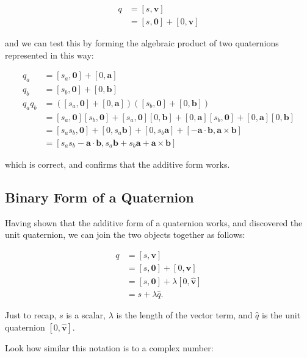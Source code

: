 \documentclass[10pt]{article}
\begin{document}
$$
\begin{aligned}
q & =[s, \mathbf{v}] \\
& =[s, \mathbf{0}]+[0, \mathbf{v}]
\end{aligned}
$$

and we can test this by forming the algebraic product of two quaternions represented in this way:

$$
\begin{aligned}
q_{a} & =\left[s_{a}, \mathbf{0}\right]+[0, \mathbf{a}] \\
q_{b} & =\left[s_{b}, \mathbf{0}\right]+[0, \mathbf{b}] \\
q_{a} q_{b} & =\left(\left[s_{a}, \mathbf{0}\right]+[0, \mathbf{a}]\right)\left(\left[s_{b}, \mathbf{0}\right]+[0, \mathbf{b}]\right) \\
& =\left[s_{a}, \mathbf{0}\right]\left[s_{b}, \mathbf{0}\right]+\left[s_{a}, \mathbf{0}\right][0, \mathbf{b}]+[0, \mathbf{a}]\left[s_{b}, \mathbf{0}\right]+[0, \mathbf{a}][0, \mathbf{b}] \\
& =\left[s_{a} s_{b}, \mathbf{0}\right]+\left[0, s_{a} \mathbf{b}\right]+\left[0, s_{b} \mathbf{a}\right]+[-\mathbf{a} \cdot \mathbf{b}, \mathbf{a} \times \mathbf{b}] \\
& =\left[s_{a} s_{b}-\mathbf{a} \cdot \mathbf{b}, s_{a} \mathbf{b}+s_{b} \mathbf{a}+\mathbf{a} \times \mathbf{b}\right]
\end{aligned}
$$

which is correct, and confirms that the additive form works.

\subsection{Binary Form of a Quaternion}
Having shown that the additive form of a quaternion works, and discovered the unit quaternion, we can join the two objects together as follows:

$$
\begin{aligned}
q & =[s, \mathbf{v}] \\
& =[s, \mathbf{0}]+[0, \mathbf{v}] \\
& =[s, \mathbf{0}]+\lambda[0, \hat{\mathbf{v}}] \\
& =s+\lambda \hat{q} .
\end{aligned}
$$

Just to recap, $s$ is a scalar, $\lambda$ is the length of the vector term, and $\hat{q}$ is the unit quaternion $[0, \hat{\mathbf{v}}]$.

Look how similar this notation is to a complex number:
\end{document}
